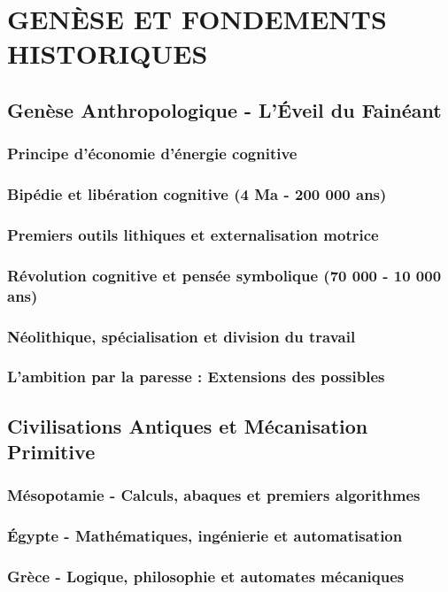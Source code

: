 \documentclass[12pt,a4paper]{book}
\begin{document}
\newpage

\part{GENÈSE ET FONDEMENTS HISTORIQUES}

\chapter{Genèse Anthropologique - L'Éveil du Fainéant}
\section{Principe d'économie d'énergie cognitive}
\section{Bipédie et libération cognitive (4 Ma - 200 000 ans)}
\section{Premiers outils lithiques et externalisation motrice}
\section{Révolution cognitive et pensée symbolique (70 000 - 10 000 ans)}
\section{Néolithique, spécialisation et division du travail}
\section{L'ambition par la paresse : Extensions des possibles}

\chapter{Civilisations Antiques et Mécanisation Primitive}
\section{Mésopotamie - Calculs, abaques et premiers algorithmes}
\section{Égypte - Mathématiques, ingénierie et automatisation}
\section{Grèce - Logique, philosophie et automates mécaniques}
\end{document}
